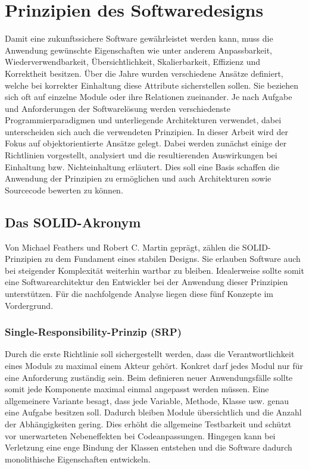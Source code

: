 \documentclass[conference]{IEEEtran}
\begin{document}


\section{Prinzipien des Softwaredesigns}

Damit eine zukunftssichere Software gewährleistet werden kann, muss die Anwendung gewünschte Eigenschaften wie unter anderem Anpassbarkeit, Wiederverwendbarkeit, Übersichtlichkeit, Skalierbarkeit, Effizienz und Korrektheit besitzen. Über die Jahre wurden verschiedene Ansätze definiert, welche bei korrekter Einhaltung diese Attribute sicherstellen sollen. Sie beziehen sich oft auf einzelne Module oder ihre Relationen zueinander. Je nach Aufgabe und Anforderungen der Softwarelösung werden verschiedenste Programmierparadigmen und unterliegende Architekturen verwendet, dabei unterscheiden sich auch die verwendeten Prinzipien. In dieser Arbeit wird der Fokus auf objektorientierte Ansätze gelegt. Dabei werden zunächst einige der Richtlinien vorgestellt, analysiert und die resultierenden Auswirkungen bei Einhaltung bzw. Nichteinhaltung erläutert. Dies soll eine Basis schaffen die Anwendung der Prinzipien zu ermöglichen und auch Architekturen sowie Sourcecode bewerten zu können.



\subsection{Das SOLID-Akronym}

Von Michael Feathers und Robert C. Martin geprägt, zählen die SOLID-Prinzipien zu dem Fundament eines stabilen Designs. \cite{martin.solid} \cite{Martin.2018} Sie erlauben Software auch bei steigender Komplexität weiterhin wartbar zu bleiben. Idealerweise sollte somit eine Softwarearchitektur den Entwickler bei der Anwendung dieser Prinzipien unterstützen. Für die nachfolgende Analyse liegen diese fünf Konzepte im Vordergrund.



\subsubsection{Single-Responsibility-Prinzip (SRP)} Durch die erste Richtlinie soll sichergestellt werden, dass die Verantwortlichkeit eines Moduls zu maximal einem Akteur gehört. Konkret darf jedes Modul nur für eine Anforderung zuständig sein. Beim definieren neuer Anwendungsfälle sollte somit jede Komponente maximal einmal angepasst werden müssen. Eine allgemeinere Variante besagt, dass jede Variable, Methode, Klasse usw. genau eine Aufgabe besitzen soll. Dadurch bleiben Module übersichtlich und die Anzahl der Abhängigkeiten gering. Dies erhöht die allgemeine Testbarkeit und schützt vor unerwarteten Nebeneffekten bei Codeanpassungen. Hingegen kann bei Verletzung eine enge Bindung der Klassen entstehen und die Software dadurch monolithische Eigenschaften entwickeln. \cite{martin.srp} \cite{Martin.2003} \cite{Martin.2018}
\end{document}
